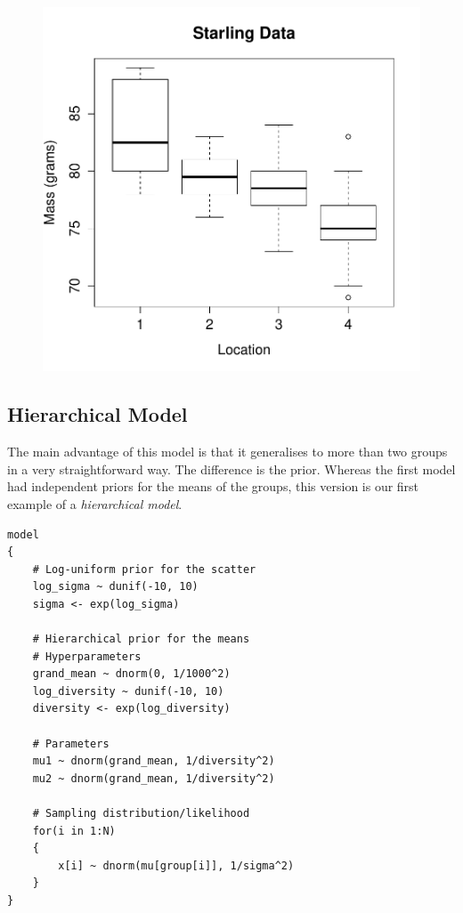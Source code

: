 \begin{figure}[ht!]
\begin{center}
\includegraphics[scale=0.6]{Figures/starling.pdf}
\end{center}
\end{figure}


\subsection{Hierarchical Model}
The main advantage of this model is that it generalises to more than two groups
in a very straightforward way. The difference is the prior. Whereas the first
model had independent priors for the means of the groups, this version is our
first example of a {\it hierarchical model}.
\begin{framed}
\begin{verbatim}
model
{
    # Log-uniform prior for the scatter
    log_sigma ~ dunif(-10, 10)
    sigma <- exp(log_sigma)

    # Hierarchical prior for the means
    # Hyperparameters
    grand_mean ~ dnorm(0, 1/1000^2)
    log_diversity ~ dunif(-10, 10)
    diversity <- exp(log_diversity)

    # Parameters
    mu1 ~ dnorm(grand_mean, 1/diversity^2)
    mu2 ~ dnorm(grand_mean, 1/diversity^2)

    # Sampling distribution/likelihood
    for(i in 1:N)
    {
        x[i] ~ dnorm(mu[group[i]], 1/sigma^2)
    }
}

\end{verbatim}
\end{framed}


